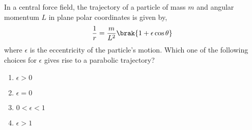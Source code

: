 \iffalse
	\chapter{2012}
	\author{AI24BTECH11001}
	\section{ph}
\fi	
    \item In a central force field, the trajectory of a particle of mass $m$ and angular momentum $L$ in plane 
    polar coordinates is given by, 
    \begin{align*}
        \frac{1}{r}= \frac{m}{L^2} \brak{1 + \epsilon\cos\theta}
    \end{align*}
    where $\epsilon$ is the eccentricity of the particle's motion. Which one of the following choices for $\epsilon$ gives rise to a parabolic trajectory?
    \begin{multicols}{4}
        \begin{enumerate}
            \item $\epsilon>0$
            \item $\epsilon=0$
            \item $0<\epsilon<1$
            \item $\epsilon>1$
        \end{enumerate}
    \end{multicols}

